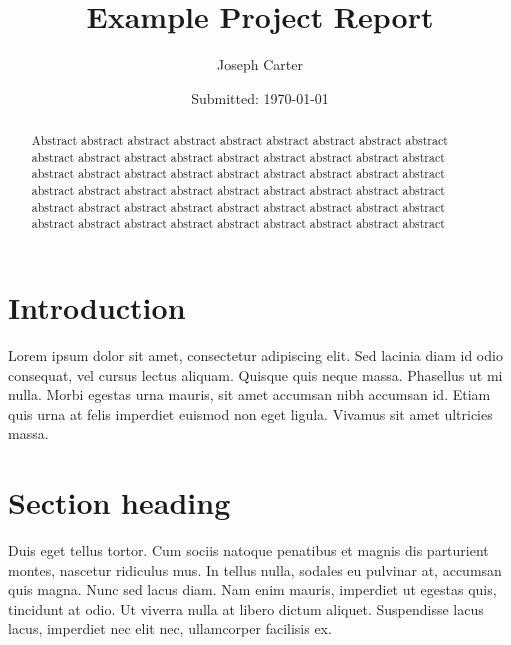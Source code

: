 \documentclass[12pt, onecolumn]{revtex4}    %
\begin{document}
                     


\title{Example Project Report} 
\date{Submitted: \today{}}
\author{Joseph Carter}

\begin{abstract}              
 
Abstract abstract abstract abstract abstract abstract abstract abstract abstract abstract abstract abstract abstract abstract abstract abstract abstract abstract abstract abstract abstract abstract abstract abstract abstract abstract abstract abstract abstract abstract abstract abstract abstract abstract abstract abstract abstract abstract abstract abstract abstract abstract abstract abstract abstract abstract abstract abstract abstract abstract abstract abstract abstract abstract 

\end{abstract}


\maketitle

\tableofcontents
\let\toc@pre\relax
\let\toc@post\relax

\newpage

\section{Introduction}

Lorem ipsum dolor sit amet, consectetur adipiscing elit. Sed lacinia diam id odio consequat, vel cursus lectus aliquam. Quisque quis neque massa. Phasellus ut mi nulla. Morbi egestas urna mauris, sit amet accumsan nibh accumsan id. Etiam quis urna at felis imperdiet euismod non eget ligula. Vivamus sit amet ultricies massa.

\section{Section heading}

Duis eget tellus tortor. Cum sociis natoque penatibus et magnis dis parturient montes, nascetur ridiculus mus. In tellus nulla, sodales eu pulvinar at, accumsan quis magna. Nunc sed lacus diam. Nam enim mauris, imperdiet ut egestas quis, tincidunt at odio. Ut viverra nulla at libero dictum aliquet. Suspendisse lacus lacus, imperdiet nec elit nec, ullamcorper facilisis ex.
\end{document}
